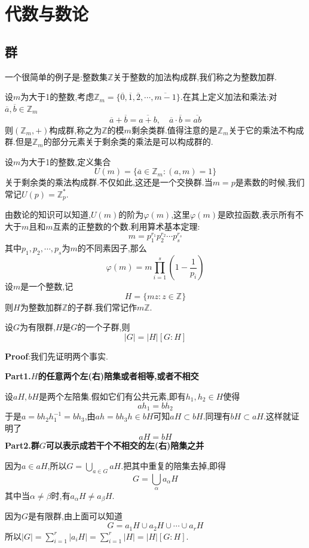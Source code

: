 \section{代数与数论}
\subsection{群}
一个很简单的例子是:整数集$\mathbb{Z}$关于整数的加法构成群,我们称之为整数加群.\par
设$m$为大于1的整数,考虑$\mathbb{Z}_m=\{\overline{0},\overline{1},\overline{2},\cdots,\overline{m-1}\}$.在其上定义加法和乘法:对$\overline{a},\overline{b}\in\mathbb{Z}_m$
$$
\overline{a}+\overline{b}=\overline{a+b},\quad \overline{a}\cdot\overline{b}=\overline{ab}
$$
则$(\mathbb{Z}_m,+)$构成群,称之为$\mathbb{Z}$的模$m$剩余类群.值得注意的是$\mathbb{Z}_m$关于它的乘法不构成群.但是$\mathbb{Z}_m$的部分元素关于剩余类的乘法是可以构成群的.\par
设$m$为大于1的整数,定义集合
$$
U(m)=\{\overline{a}\in\mathbb{Z}_m:(a,m)=1\}
$$
关于剩余类的乘法构成群.不仅如此,这还是一个交换群.当$m=p$是素数的时候,我们常记$U(p)=\mathbb{Z}_{p}^{*}$.\par
由数论的知识可以知道,$U(m)$的阶为$\varphi (m)$,这里$\varphi (m)$是欧拉函数,表示所有不大于$m$且和$m$互素的正整数的个数.利用算术基本定理:
$$
m=p_{1}^{r_1}p_{2}^{r_2}\cdots p_{s}^{r_s}
$$
其中$p_1,p_2,\cdots,p_s$为$m$的不同素因子,那么
$$
\varphi (m)=m\prod_{i=1}^{s}\left(1-\frac{1}{p_i}\right)
$$
\qquad 设$m$是一个整数,记
$$
H=\{mz:z\in\mathbb{Z}\}
$$
则$H$为整数加群$\mathbb{Z}$的子群.我们常记作$m\mathbb{Z}$.\par
\begin{tcolorbox}[colback=KuangNei,colframe=BianKuang,title=\textbf{Lagrange定理},sharpish corners]
    设$G$为有限群,$H$是$G$的一个子群,则
    $$
    |G|=|H|[G:H]
    $$
\end{tcolorbox}
\textbf{Proof}:我们先证明两个事实.\par
\textbf{Part1.$H$的任意两个左(右)陪集或者相等,或者不相交}\par
设$aH,bH$是两个左陪集.假如它们有公共元素,即有$h_1,h_2\in H$使得
$$
ah_1=bh_2
$$
于是$a=bh_2h_1^{-1}=bh_3$,由$ah=bh_3h\in bH$可知$aH\subset bH$.同理有$bH\subset aH$.这样就证明了
$$
aH=bH
$$
\qquad \textbf{Part2.群$G$可以表示成若干个不相交的左(右)陪集之并}\par
因为$a\in aH$,所以$G=\bigcup_{a\in G}aH$.把其中重复的陪集去掉,即得
$$
G=\bigcup_{\alpha}a_{\alpha}H
$$
其中当$\alpha\neq \beta$时,有$a_{\alpha}H\neq a_{\beta}H$.\par
因为$G$是有限群,由上面可以知道
$$
G=a_1H\cup a_2H\cup\cdots \cup a_rH
$$
所以$|G|=\sum_{i=1}^r|a_iH|=\sum_{i=1}^r|H|=|H|[G:H]$.\par

